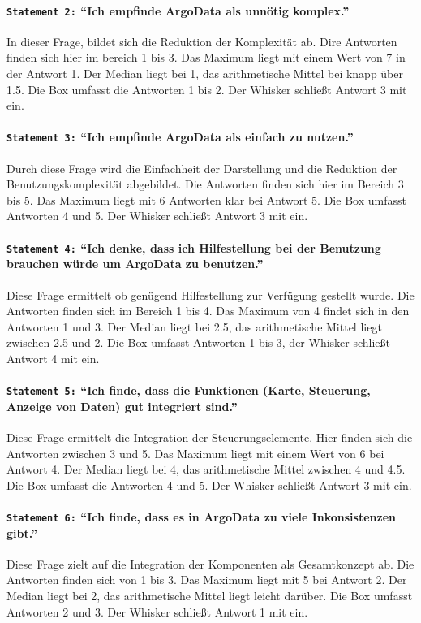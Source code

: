  \paragraph{\texttt{Statement 2:} "`Ich empfinde ArgoData als unnötig komplex."'}
    In dieser Frage, bildet sich die Reduktion der Komplexität ab. Dire Antworten finden sich hier im bereich 1 bis 3. Das Maximum liegt mit einem Wert von 7 in der Antwort 1. Der Median liegt bei 1, das arithmetische Mittel bei knapp über 1.5. Die Box umfasst die Antworten 1 bis 2. Der Whisker schließt Antwort 3 mit ein.

  \paragraph{\texttt{Statement 3:} "`Ich empfinde ArgoData als einfach zu nutzen."'}
    Durch diese Frage wird die Einfachheit der Darstellung und die Reduktion der Benutzungskomplexität abgebildet. Die Antworten finden sich hier im Bereich 3 bis 5. Das Maximum liegt mit 6 Antworten klar bei Antwort 5. Die Box umfasst Antworten 4 und 5. Der Whisker schließt Antwort 3 mit ein.

\paragraph{\texttt{Statement 4:} "`Ich denke, dass ich Hilfestellung bei der Benutzung brauchen würde um ArgoData zu benutzen."'}
    Diese Frage ermittelt ob genügend Hilfestellung zur Verfügung gestellt wurde.  Die Antworten finden sich im Bereich 1 bis 4. Das Maximum von 4 findet sich in den Antworten 1 und 3.  Der Median liegt bei 2.5, das arithmetische Mittel liegt zwischen 2.5 und 2. Die Box umfasst Antworten 1 bis 3, der Whisker schließt Antwort 4 mit ein.

\paragraph{\texttt{Statement 5:} "`Ich finde, dass die Funktionen (Karte, Steuerung, Anzeige von Daten) gut integriert sind."'}
    Diese Frage ermittelt die Integration der Steuerungselemente. Hier finden sich die Antworten zwischen 3 und 5. Das Maximum liegt mit einem Wert von 6 bei Antwort 4. Der Median liegt bei 4, das arithmetische Mittel zwischen 4 und 4.5. Die Box umfasst  die Antworten 4 und 5. Der Whisker schließt Antwort 3 mit ein.

\paragraph{\texttt{Statement 6:} "`Ich finde, dass es in ArgoData zu viele Inkonsistenzen gibt."'}
    Diese Frage zielt auf die Integration der Komponenten als Gesamtkonzept ab. Die Antworten finden sich von 1 bis 3. Das Maximum liegt mit 5 bei Antwort 2. Der Median liegt bei 2, das arithmetische Mittel liegt leicht darüber. Die Box umfasst Antworten 2 und 3. Der Whisker schließt Antwort 1 mit ein.

